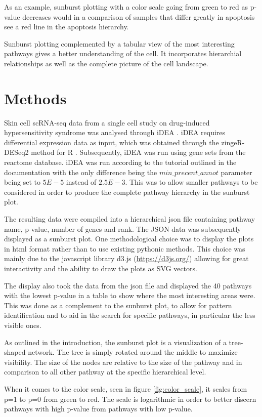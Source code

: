 \documentclass[11pt]{article}
\begin{document}
  As an example, sunburst plotting with a color scale going from green to red as p-value decreases would in a comparison of samples that differ greatly in apoptosis see a red line in the apoptosis hierarchy.

  Sunburst plotting complemented by a tabular view of the most interesting pathways gives a better understanding of the cell. It incorporates hierarchial relationships as well as the complete picture of the cell landscape.


\section*{Methods}
  Skin cell scRNA-seq data from a single cell study on drug-induced hypersensitivity syndrome was analysed through iDEA \cite{idea}. iDEA requires differential expression data as input, which was obtained through the zingeR-DESeq2 method for R \cite{deseq2}. Subsequently, iDEA was run using gene sets from the reactome database. iDEA was run according to the tutorial outlined in the documentation with the only difference being the $min\_precent\_annot$ parameter being set to $5E-5$ instead of $2.5E-3$. This was to allow smaller pathways to be considered in order to produce the complete pathway hierarchy in the sunburst plot.

  The resulting data were compiled into a hierarchical json file containing pathway name, p-value, number of genes and rank. The JSON data was subsequently displayed as a sunburst plot. One methodological choice was to display the plots in html format rather than to use existing pythonic methods. This choice was mainly due to the javascript library d3.js (\url{https://d3js.org/}) allowing for great interactivity and the ability to draw the plots as SVG vectors.

  The display also took the data from the json file and displayed the 40 pathways with the lowest p-value in a table to show where the most interesting areas were. This was done as a complement to the sunburst plot, to allow for pattern identification and to aid in the search for specific pathways, in particular the less visible ones.

  As outlined in the introduction, the sunburst plot is a visualization of a tree-shaped network. The tree is simply rotated around the middle to maximize visibility. The size of the nodes are relative to the size of the pathway and in comparison to all other pathway at the specific hierarchical level.

  When it comes to the color scale, seen in figure \ref{fig:color_scale}, it scales from p=1 to p=0 from green to red. The scale is logarithmic in order to better discern pathways with high p-value from pathways with low p-value.
\end{document}
